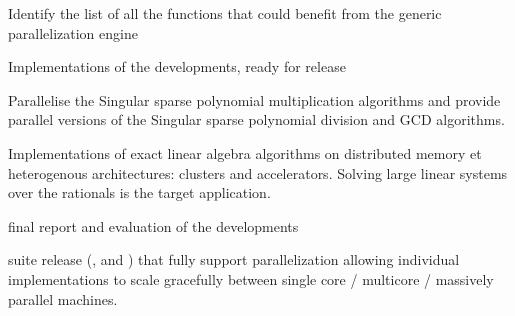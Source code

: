 \begin{workpackage}
\begin{wpdelivs}
  \begin{wpdeliv}[due=36,id=pari-hpc2,dissem=PU,nature=R,lead=UB]
  {Identify the list of all the functions that could benefit from the generic parallelization engine}
  \end{wpdeliv}
  \begin{wpdeliv}[due=47,miles=eval,id=GAP-software-final,dissem=PU,nature=OTHER,lead=SA]
      {Implementations of the \GAP developments, ready for release}
  \end{wpdeliv}
  \begin{wpdeliv}[due=48,miles=eval,id=singular-polyarith,dissem=PU,nature=DEM, lead=UK]
      {Parallelise the Singular sparse polynomial multiplication algorithms and
        provide parallel versions of the Singular sparse polynomial division and GCD algorithms.}
\end{wpdeliv}
  \begin{wpdeliv}[due=48,miles=eval,id=LinBox-distributed,dissem=PU,nature=DEM, lead=UJF]
    {Implementations of exact linear algebra algorithms on distributed memory et heterogenous
      architectures: clusters and accelerators. Solving large linear systems
      over the rationals is the target application.} 
  \end{wpdeliv}
  \begin{wpdeliv}[due=48,miles=eval,id=GAP-APIs-report,dissem=PU,nature=R,lead=SA]
      {final report and evaluation of the \GAP developments}
  \end{wpdeliv}
  \begin{wpdeliv}[due=48,id=pari-hpc3,dissem=PU,nature=DEM,lead=UB]
  {\Pari suite release (\libpari, \GP and \GPtoC) that fully support parallelization
   allowing individual implementations to scale gracefully between single
   core / multicore / massively parallel machines.}
  \end{wpdeliv}

\end{wpdelivs}
\end{workpackage}


